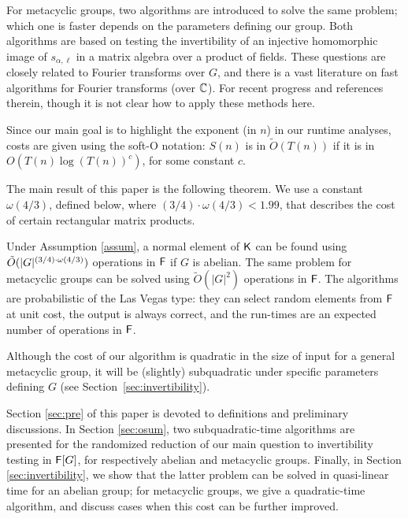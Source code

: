 For metacyclic groups, two algorithms are introduced to solve the same
problem; which one is faster depends on the parameters defining our
group. Both algorithms are based on testing the invertibility of an
injective homomorphic image of $s_{\alpha,\ell}$ in a matrix algebra over a
product of fields. These questions are closely related to Fourier
transforms over $G$, and there is a vast literature on fast algorithms for
Fourier transforms (over $\mathbb{C}$). For recent progress
\cite{ClaMu04,MaRockWol18} and references therein, though it is not clear
how to apply these methods here.

Since our main goal is to highlight
the exponent (in $n$) in our runtime analyses, costs are given using
the soft-O notation: $S(n)$ is in $\tilde{O}(T(n))$ if it is in
$O(T(n) \log(T(n))^c)$, for some constant $c$.

The main result of this paper is the following theorem.  We use a constant
$\omega(4/3)$, defined below, where $(3/4)\cdot\omega(4/3)<1.99$, that
describes the cost of certain rectangular matrix products.

\begin{theorem}
  \label{thm:main}
  Under Assumption \ref{assum}, a normal element of ${\mathsf{K}}$ can be found using
  $\tilde{O}(\vert G \vert ^{(3/4)\cdot \omega(4/3)})$ operations in ${\mathsf{F}}$ if $G$ is abelian.  The same problem for
  metacyclic groups can be solved using $\tilde{O}(\vert G \vert^2)$
  operations in ${\mathsf{F}}$. The algorithms are probabilistic of the Las Vegas
  type: they can select random elements from ${\mathsf{F}}$ at unit
  cost, the output is always correct, and the run-times are an expected
  number of operations in ${\mathsf{F}}$.
\end{theorem}

Although the cost of our algorithm is quadratic in the size of input for a
general metacyclic group, it will be (slightly) subquadratic under specific
parameters defining $G$ (see Section~\ref{sec:invertibility}).

Section \ref{sec:pre} of this paper is devoted to definitions and
preliminary discussions.  In Section \ref{sec:osum}, two
subquadratic-time algorithms are presented for the randomized reduction
of our main question to invertibility testing in ${\mathsf{F}}[G]$, for
respectively abelian and metacyclic groups.  Finally, in Section
\ref{sec:invertibility}, we show that the latter problem can be solved
in quasi-linear time for an abelian group; for metacyclic
groups, we give a quadratic-time algorithm, and discuss cases when
this cost can be further improved.

